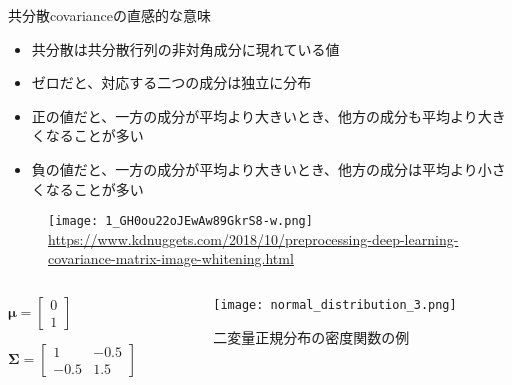 \documentclass[aspectratio=169,unicode,dvipdfmx,14pt]{beamer}
\begin{document}
\begin{frame}{共分散covarianceの直感的な意味}
\begin{itemize}
\item 共分散は共分散行列の非対角成分に現れている値
\item ゼロだと、対応する二つの成分は独立に分布
\item 正の値だと、一方の成分が平均より大きいとき、他方の成分も平均より大きくなることが多い
\item 負の値だと、一方の成分が平均より大きいとき、他方の成分は平均より小さくなることが多い
\end{itemize}
\end{frame}

\begin{frame}
\begin{figure}[t]
\begin{center}
\texttt{[image: 1\_GH0ou22oJEwAw89GkrS8-w.png]}
\href{https://www.kdnuggets.com/2018/10/preprocessing-deep-learning-covariance-matrix-image-whitening.html}{\tiny\url{https://www.kdnuggets.com/2018/10/preprocessing-deep-learning-covariance-matrix-image-whitening.html}}
\label{}
\end{center}
\end{figure}
\end{frame}

\begin{frame}
\begin{columns}[c,onlytextwidth]
\begin{column}{.3\textwidth}
$\bm{\mu} = \begin{bmatrix} 0 \\ 1 \end{bmatrix}$

$\bm{\Sigma} = \begin{bmatrix} 1 & -0.5 \\ -0.5 & 1.5 \end{bmatrix}$
\end{column}
\begin{column}{.7\textwidth}
\begin{figure}[c]
\begin{center}
\texttt{[image: normal\_distribution\_3.png]}
\end{center}
\caption{二変量正規分布の密度関数の例}
\end{figure}
\end{column}
\end{columns}
\end{frame}
\end{document}
